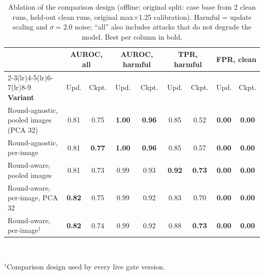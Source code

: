 \begin{table}[!t]
\centering
\caption{Ablation of the comparison design (offline; original split: case base from 2 clean runs, held-out clean runs, original max$\times$1.25 calibration). Harmful = update scaling and $\sigma{=}2.0$ noise; ``all'' also includes attacks that do not degrade the model. Best per column in bold.}
\label{tab:ablation}
\footnotesize
\setlength{\tabcolsep}{4pt}
\begin{tabular}{@{}lcccccccc@{}}
\toprule
& \multicolumn{2}{c}{\textbf{AUROC, all}} & \multicolumn{2}{c}{\textbf{AUROC, harmful}} & \multicolumn{2}{c}{\textbf{TPR, harmful}} & \multicolumn{2}{c}{\textbf{FPR, clean}} \\ \cmidrule(lr){2-3}\cmidrule(lr){4-5}\cmidrule(lr){6-7}\cmidrule(lr){8-9}
\textbf{Variant} & Upd. & Ckpt. & Upd. & Ckpt. & Upd. & Ckpt. & Upd. & Ckpt. \\
\midrule
Round-agnostic, pooled images (PCA 32) & 0.81 & 0.75 & \textbf{1.00} & \textbf{0.96} & 0.85 & 0.52 & \textbf{0.00} & \textbf{0.00} \\
Round-agnostic, per-image & 0.81 & \textbf{0.77} & \textbf{1.00} & \textbf{0.96} & 0.85 & 0.57 & \textbf{0.00} & \textbf{0.00} \\
Round-aware, pooled images & 0.81 & 0.73 & 0.99 & 0.93 & \textbf{0.92} & \textbf{0.73} & \textbf{0.00} & \textbf{0.00} \\
Round-aware, per-image, PCA 32 & \textbf{0.82} & 0.75 & 0.99 & 0.92 & 0.83 & 0.70 & \textbf{0.00} & \textbf{0.00} \\
Round-aware, per-image$^\dagger$ & \textbf{0.82} & 0.74 & 0.99 & 0.92 & 0.88 & \textbf{0.73} & \textbf{0.00} & \textbf{0.00} \\
\bottomrule
\end{tabular}
\\[2pt]
\parbox{\textwidth}{\scriptsize $^\dagger$Comparison design used by every live gate version.}
\end{table}
